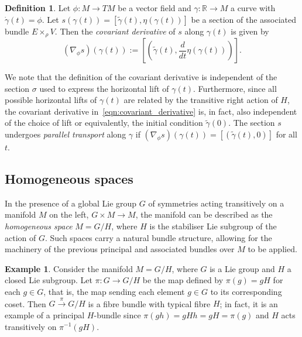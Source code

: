 \documentclass[12pt,a4paper]{article}
\numberwithin{equation}{section}
\newcommand{\R}{\mathbb{R}}
\theoremstyle{plain}
\theoremstyle{definition}
\newtheorem{definition}[theorem]{Definition}
\newtheorem{example}[theorem]{Example}
\theoremstyle{remark}
\begin{document}
\begin{definition}\label{dfn:parallel_transport_associated}
    Let $\phi:M \to TM$ be a vector field and $\gamma:\R \to M$ a curve with $\dot{\gamma}(t)=\phi$. Let $s(\gamma(t)) = [\tilde{\gamma}(t),\eta(\gamma(t))]$ be a section of the associated bundle $E \times_{\rho} V$. Then the \textit{covariant derivative} of $s$ along $\gamma(t)$ is given by
    \begin{equation}\label{eqn:covariant_derivative}
        (\nabla_{\phi}s)(\gamma(t)):=\left[\left(\tilde{\gamma}(t),\frac{d}{dt}\eta(\gamma(t))\right)\right].
    \end{equation}
\end{definition}

We note that the definition of the covariant derivative is independent of the section $\sigma$ used to express the horizontal lift of $\gamma(t)$. Furthermore, since all possible horizontal lifts of $\gamma(t)$ are related by the transitive right action of $H$, the covariant derivative in~\eqref{eqn:covariant_derivative} is, in fact, also independent of the choice of lift or equivalently, the initial condition $\tilde{\gamma}(0)$. The section $s$ undergoes \textit{parallel transport} along $\gamma$ if $(\nabla_{\phi}s)(\gamma(t))=\left[\left(\tilde{\gamma}(t),0\right)\right]$ for all $t$. 

\subsection{Homogeneous spaces}
In the presence of a global Lie group $G$ of symmetries acting transitively on a manifold $M$ on the left, $G \times M \to M$, the manifold can be described as the \textit{homogeneous space} $M = G/H$, where $H$ is the stabiliser Lie subgroup of the action of $G$. Such spaces carry a natural bundle structure, allowing for the machinery of the previous principal and associated bundles over $M$ to be applied.

\begin{example}\label{ex:G_as_principal_bundle}
    Consider the manifold $M = G/H$, where $G$ is a Lie group and $H$ a closed Lie subgroup. Let $\pi:G \to G/H$ be the map defined by $\pi(g)=gH$ for each $g\in G$, that is, the map sending each element $g\in G$ to its corresponding coset. Then $G\overset{\pi}{\to}G/H$ is a fibre bundle with typical fibre $H$; in fact, it is an example of a principal $H$-bundle since $\pi(gh) = gHh = gH = \pi(g)$ and $H$ acts transitively on $\pi^{-1}(gH)$.
\end{example}
\end{document}
